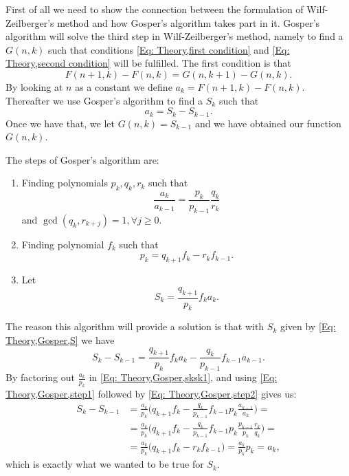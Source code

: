 First of all we need to show the connection between the formulation of Wilf-Zeilberger's method and how Gosper's algorithm takes part in it. Gosper's algorithm will solve the third step in Wilf-Zeilberger's method, namely to find a $G(n,k)$ such that conditions \ref{Eq: Theory,first condition} and \ref{Eq: Theory,second condition} will be fulfilled. The first condition is that
\begin{equation}
  F(n+1,k)-F(n,k) = G(n,k+1)-G(n,k).
\end{equation}
By looking at $n$ as a constant we define $a_k=F(n+1,k)-F(n,k)$. Thereafter we use Gosper's algorithm to find a $S_k$ such that
\begin{equation}
  a_k = S_k-S_{k-1}.
\end{equation}
Once we have that, we let $G(n,k) = S_{k-1}$ and we have obtained our function $G(n,k)$.

The steps of Gosper's algorithm are:
\begin{enumerate}
  \item Finding polynomials $p_k,q_k,r_k$ such that
  \begin{equation}\label{Eq: Theory,Gosper,step1}
    \frac{a_k}{a_{k-1}} = \frac{p_k}{p_{k-1}}\frac{q_k}{r_k}
  \end{equation}
  and $\gcd(q_k,r_{k+j})=1, \forall j\geq 0$.
  \item Finding polynomial $f_k$ such that
  \begin{equation}\label{Eq: Theory,Gosper,step2}
    p_k=q_{k+1}f_k-r_kf_{k-1}.
  \end{equation}
  \item Let
  \begin{equation}\label{Eq: Theory,Gosper,S}
    S_k=\frac{q_{k+1}}{p_k}f_ka_k.
  \end{equation}
\end{enumerate}
The reason this algorithm will provide a solution is that with $S_k$ given by \ref{Eq: Theory,Gosper,S} we have
\begin{equation}\label{Eq: Theory,Gosper,sksk1}
  S_k-S_{k-1} = \frac{q_{k+1}}{p_k}f_ka_k-\frac{q_{k}}{p_{k-1}}f_{k-1}a_{k-1}.
\end{equation}
By factoring out $\frac{a_k}{p_k}$ in \ref{Eq: Theory,Gosper,sksk1}, and using \ref{Eq: Theory,Gosper,step1} followed by \ref{Eq: Theory,Gosper,step2} gives us:
\begin{equation}
  \begin{split}
    S_k-S_{k-1} & = \frac{a_k}{p_k}\Big(q_{k+1}f_k-\frac{q_k}{p_{k-1}}f_{k-1}p_k\frac{a_{k-1}}{a_k}\Big) = \\
    & =\frac{a_k}{p_k}\Big(q_{k+1}f_k-\frac{q_k}{p_{k-1}}f_{k-1}p_k\frac{p_{k-1}}{p_k}\frac{r_k}{q_k}\Big)= \\
    & = \frac{a_k}{p_k}\Big(q_{k+1}f_k-r_kf_{k-1}\Big) = \frac{a_k}{p_k}p_k = a_k,
  \end{split}
\end{equation}
which is exactly what we wanted to be true for $S_k$.

